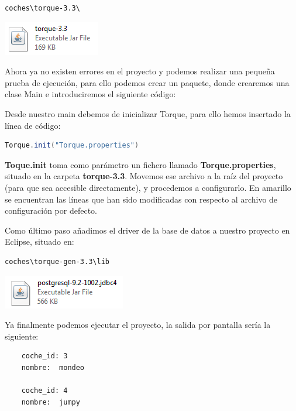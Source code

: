 \documentclass[12pt, oneside]{article}
\begin{document}
\begin{lstlisting}
coches\torque-3.3\
\end{lstlisting}

	\begin{center}
		\includegraphics{img/torque-file.png}
	\end{center}
	
	Ahora ya no existen errores en el proyecto y podemos realizar una pequeña prueba de ejecución, para ello podemos crear un paquete, donde crearemos una clase Main e introduciremos el siguiente código:
	
	
	
	Desde nuestro main debemos de inicializar Torque, para ello hemos insertado la línea de código: 
	\begin{lstlisting}[language=java]
	Torque.init("Torque.properties")
	\end{lstlisting} 
	
	{\bf Toque.init} toma como parámetro un fichero llamado {\bf Torque.properties}, situado en la carpeta {\bf torque-3.3}. Movemos ese archivo a la raíz del proyecto (para que sea accesible directamente), y procedemos a configurarlo. En amarillo se encuentran las líneas que han sido modificadas con respecto al archivo de configuración por defecto.
	
	
	
	Como último paso añadimos el driver de la base de datos a nuestro proyecto en Eclipse, situado en:
	
\begin{lstlisting}
coches\torque-gen-3.3\lib
\end{lstlisting}

	\begin{center}
		\includegraphics{img/postgresql-file.png}
	\end{center}

	Ya finalmente podemos ejecutar el proyecto, la salida por pantalla sería la siguiente: 
	
	\begin{lstlisting}
	coche_id: 3
	nombre:  mondeo

	coche_id: 4
	nombre:  jumpy
	\end{lstlisting}
	
\end{document}
